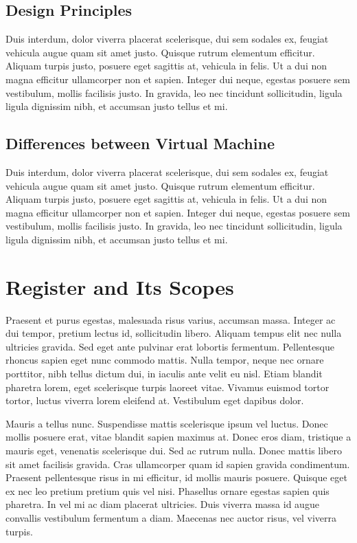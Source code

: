 \subsection{Design Principles}
Duis interdum, dolor viverra placerat scelerisque, dui sem sodales ex, feugiat vehicula augue quam sit amet justo. Quisque rutrum elementum efficitur. Aliquam turpis justo, posuere eget sagittis at, vehicula in felis. Ut a dui non magna efficitur ullamcorper non et sapien. Integer dui neque, egestas posuere sem vestibulum, mollis facilisis justo. In gravida, leo nec tincidunt sollicitudin, ligula ligula dignissim nibh, et accumsan justo tellus et mi.

\subsection{Differences between Virtual Machine}
Duis interdum, dolor viverra placerat scelerisque, dui sem sodales ex, feugiat vehicula augue quam sit amet justo. Quisque rutrum elementum efficitur. Aliquam turpis justo, posuere eget sagittis at, vehicula in felis. Ut a dui non magna efficitur ullamcorper non et sapien. Integer dui neque, egestas posuere sem vestibulum, mollis facilisis justo. In gravida, leo nec tincidunt sollicitudin, ligula ligula dignissim nibh, et accumsan justo tellus et mi.


\section{Register and Its Scopes}
Praesent et purus egestas, malesuada risus varius, accumsan massa. Integer ac dui tempor, pretium lectus id, sollicitudin libero. Aliquam tempus elit nec nulla ultricies gravida. Sed eget ante pulvinar erat lobortis fermentum. Pellentesque rhoncus sapien eget nunc commodo mattis. Nulla tempor, neque nec ornare porttitor, nibh tellus dictum dui, in iaculis ante velit eu nisl. Etiam blandit pharetra lorem, eget scelerisque turpis laoreet vitae. Vivamus euismod tortor tortor, luctus viverra lorem eleifend at. Vestibulum eget dapibus dolor.

Mauris a tellus nunc. Suspendisse mattis scelerisque ipsum vel luctus. Donec mollis posuere erat, vitae blandit sapien maximus at. Donec eros diam, tristique a mauris eget, venenatis scelerisque dui. Sed ac rutrum nulla. Donec mattis libero sit amet facilisis gravida. Cras ullamcorper quam id sapien gravida condimentum. Praesent pellentesque risus in mi efficitur, id mollis mauris posuere. Quisque eget ex nec leo pretium pretium quis vel nisi. Phasellus ornare egestas sapien quis pharetra. In vel mi ac diam placerat ultricies. Duis viverra massa id augue convallis vestibulum fermentum a diam. Maecenas nec auctor risus, vel viverra turpis.

